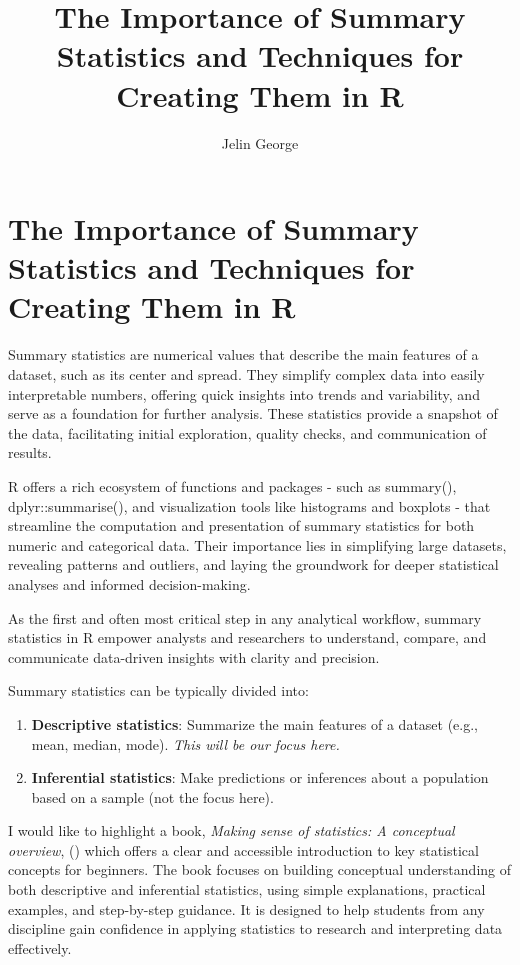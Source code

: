 \documentclass[
  man,
  floatsintext,
  longtable,
  nolmodern,
  notxfonts,
  notimes,
  colorlinks=true,linkcolor=blue,citecolor=blue,urlcolor=blue]{apa7}
\title{The Importance of Summary Statistics and Techniques for Creating
Them in R}
\author{Jelin George}
\affiliation{
{Hochschule Fresenius - University of Applied Science}}
\begin{document}
\maketitle

\hypertarget{toc}{}
\tableofcontents
\newpage
\section[Introduction]{The Importance of Summary Statistics and
Techniques for Creating Them in R}

\setcounter{secnumdepth}{-\maxdimen} %

\setlength\LTleft{0pt}


Summary statistics are numerical values that describe the main features
of a dataset, such as its center and spread. They simplify complex data
into easily interpretable numbers, offering quick insights into trends
and variability, and serve as a foundation for further analysis. These
statistics provide a snapshot of the data, facilitating initial
exploration, quality checks, and communication of results.

R offers a rich ecosystem of functions and packages - such as summary(),
dplyr::summarise(), and visualization tools like histograms and boxplots
- that streamline the computation and presentation of summary statistics
for both numeric and categorical data. Their importance lies in
simplifying large datasets, revealing patterns and outliers, and laying
the groundwork for deeper statistical analyses and informed
decision-making.

As the first and often most critical step in any analytical workflow,
summary statistics in R empower analysts and researchers to understand,
compare, and communicate data-driven insights with clarity and
precision.

Summary statistics can be typically divided into:

\begin{enumerate}
\def\labelenumi{\arabic{enumi}.}
\item
  \textbf{Descriptive statistics}: Summarize the main features of a
  dataset (e.g., mean, median, mode). \emph{This will be our focus
  here.}
\item
  \textbf{Inferential statistics}: Make predictions or inferences about
  a population based on a sample (not the focus here).
\end{enumerate}

I would like to highlight a book, \emph{Making sense of statistics: A
conceptual overview}, ()
which offers a clear and accessible introduction to key statistical
concepts for beginners. The book focuses on building conceptual
understanding of both descriptive and inferential statistics, using
simple explanations, practical examples, and step-by-step guidance. It
is designed to help students from any discipline gain confidence in
applying statistics to research and interpreting data effectively.
\end{document}
